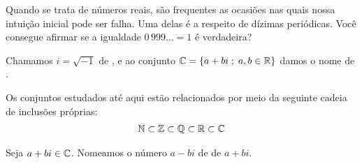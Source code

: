 Quando se trata de números reais, são frequentes as ocasiões nas quais nossa intuição inicial pode ser falha. Uma delas é a respeito de dízimas periódicas. Você consegue afirmar se a igualdade $0\,999\ldots=1$ é verdadeira?

\begin{definition}
Chamamos $i = \sqrt {-1}$ de , e ao conjunto $\mathbb{C} = \left\{  a+bi \;;\; a,b \in \mathbb{R}\right\}$ damos o nome de .
\end{definition}

Os conjuntos estudados até aqui estão relacionados por meio da seguinte cadeia de inclusões próprias:
%
\begin{align*}
\mathbb{N} \subset \mathbb{Z} \subset \mathbb{Q} \subset \mathbb{R} \subset \mathbb{C}
\end{align*}

\begin{definition}
Seja $a+bi \in \mathbb{C}$. Nomeamos o número $a-bi$ de  de $a+bi$.
\end{definition}